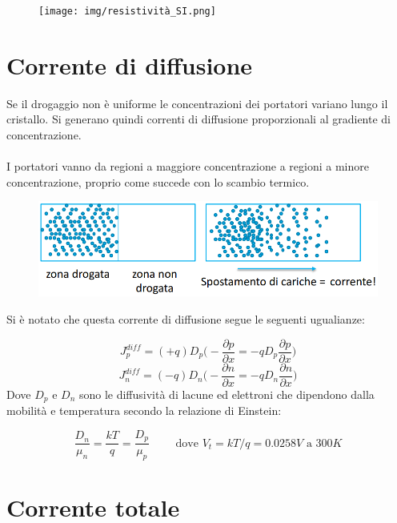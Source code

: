 \begin{figure}[htbp]
    \centering
    \texttt{[image: img/resistività\_SI.png]}    
\end{figure}

\newpage
\section{Corrente di diffusione}
Se	il	drogaggio	non	è	uniforme	le	concentrazioni	dei	portatori	
variano	lungo	il	cristallo. Si	generano	quindi	correnti	di	diffusione	proporzionali	al	gradiente	di	
concentrazione.

\paragraph{}
I	portatori	vanno	da	regioni	a	maggiore	concentrazione	a	regioni	a minore	concentrazione, proprio come succede con lo scambio termico.
\begin{figure}[htbp]
    \centering
    \includegraphics[width=0.7\linewidth]{img/corrente_diff.png}
\end{figure}

Si è notato che questa corrente di diffusione segue le seguenti ugualianze:

\begin{equation*}
    J_p^{diff} = (+q)D_p\biggl(-\frac{\partial p}{\partial x} = -qD_p\frac{\partial p}{\partial x}\biggl)
\end{equation*}
\begin{equation*}
    J_n^{diff} = (-q)D_n\biggl(-\frac{\partial n}{\partial x} = -qD_n\frac{\partial n}{\partial x}\biggl)
\end{equation*}
Dove $D_p \text{ e } D_n$ sono le diffusività	di	lacune	ed	elettroni	che	dipendono	dalla	
mobilità	e	temperatura	secondo	la	relazione	di	Einstein:

\begin{equation*}
    \frac{D_n}{\mu_n} = \frac{kT}{q} = \frac{D_p}{\mu_p} \qquad \text{ dove } V_t = kT/q = 0.0258V \text{ a } 300K
\end{equation*}

\section{Corrente totale}

